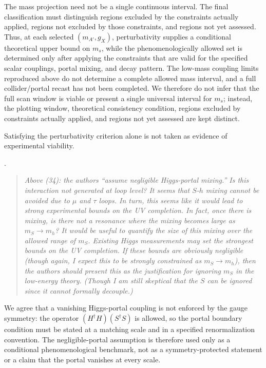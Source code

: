 \documentclass[12pt,a4paper]{article}
\begin{document}
The mass projection need not be a single continuous interval. The final classification must distinguish regions excluded by the constraints actually applied, regions not excluded by those constraints, and regions not yet assessed. Thus, at each selected \((m_{A'},g_X)\), perturbativity supplies a conditional theoretical upper bound on \(m_s\), while the phenomenologically allowed set is determined only after applying the constraints that are valid for the specified scalar couplings, portal mixing, and decay pattern. The low-mass coupling limits reproduced above do not determine a complete allowed mass interval, and a full collider/portal recast has not been completed. We therefore do not infer that the full scan window is viable or present a single universal interval for \(m_s\); instead, the plotting window, theoretical consistency condition, regions excluded by constraints actually applied, and regions not yet assessed are kept distinct.

Satisfying the perturbativity criterion alone is not taken as evidence of experimental viability.

\medskip
{}. \begin{quote}\itshape
Above (34): the authors ``assume negligible Higgs-portal mixing.'' Is this interaction not generated at loop level? It seems that \(S\)-\(h\) mixing cannot be avoided due to \(\mu\) and \(\tau\) loops. In turn, this seems like it would lead to strong experimental bounds on the UV completion. In fact, once there is mixing, is there not a resonance where the mixing becomes large as \(m_S\to m_h\)? It would be useful to quantify the size of this mixing over the allowed range of \(m_S\). Existing Higgs measurements may set the strongest bounds on the UV completion. If these bounds are obviously negligible (though again, I expect this to be strongly constrained as \(m_S\to m_h\)), then the authors should present this as the justification for ignoring \(m_S\) in the low-energy theory. (Though I am still skeptical that the \(S\) can be ignored since it cannot formally decouple.)\end{quote}

We agree that a vanishing Higgs-portal coupling is not enforced by the gauge symmetry: the operator \((H^\dagger H)(S^\dagger S)\) is allowed, so the portal boundary condition must be stated at a matching scale and in a specified renormalization convention. The negligible-portal assumption is therefore used only as a conditional phenomenological benchmark, not as a symmetry-protected statement or a claim that the portal vanishes at every scale.
\end{document}
